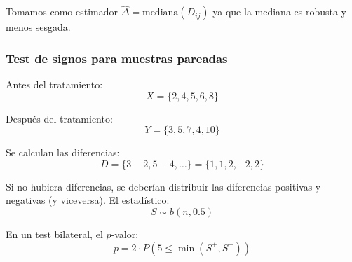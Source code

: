 Tomamos como estimador 
\(\hat{\Delta} = \text{mediana}(D_{ij})\) ya que la mediana es robusta y menos sesgada.

\subsubsection{Test de signos para muestras pareadas}

Antes del tratamiento:
\[
    X = \{2, 4, 5, 6, 8\}
\]

Después del tratamiento:
\[
    Y = \{3, 5, 7, 4, 10\}
\]

Se calculan las diferencias:
\[
    D = \{3-2, 5-4, \dots\} = \{1, 1, 2, -2, 2\}
\]

Si no hubiera diferencias, se deberían distribuir las diferencias positivas y negativas (y viceversa). El estadístico:
\[
    S \sim b(n, 0.5)
\]

En un test bilateral, el $p$-valor:
\[
    p = 2 \cdot P(5 \leq \min(S^+, S^-))
\]
